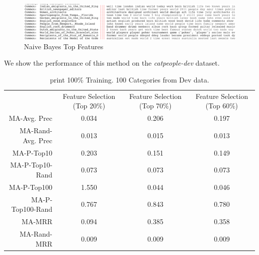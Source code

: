\documentclass{article}
\begin{document}
\begin{figure}[htbp]
  \begin{adjustwidth}{-5.5cm}{}
  \includegraphics[width=1.18\linewidth]{figures/feature_analysis.png}
  \caption{Naive Bayes Top Features}
  \label{fig:nb-feature-analysis}
\end{adjustwidth}
\end{figure}

We show the performance of this method on the
\textit{catpeople-dev} dataset.
\begin{table}[htbp]
  \centering
{}
  \begin{tabular}{r  c  c c }\toprule
                  & Feature Selection (Top 20\%) & Feature Selection (Top 70\%) & Feature Selection (Top 60\%) \\
MA-Avg. Prec      & 0.034                        & 0.206                        & 0.197                        \\
MA-Rand-Avg. Prec & 0.013                        & 0.015                        & 0.013                        \\
MA-P-Top10        & 0.203                        & 0.151                        & 0.149                        \\
MA-P-Top10-Rand   & 0.073                        & 0.073                        & 0.073                        \\
MA-P-Top100       & 1.550                        & 0.044                        & 0.046                        \\
MA-P-Top100-Rand  & 0.767                        & 0.843                        & 0.780                        \\
MA-MRR            & 0.094                        & 0.385                        & 0.358                        \\
MA-Rand-MRR       & 0.009                        & 0.009                        & 0.009                        \\
\bottomrule\end{tabular}
  \caption{print 100\% Training. 100 Categories from Dev data.}
  \label{tab:summary-nb}
\end{table}
\end{document}
